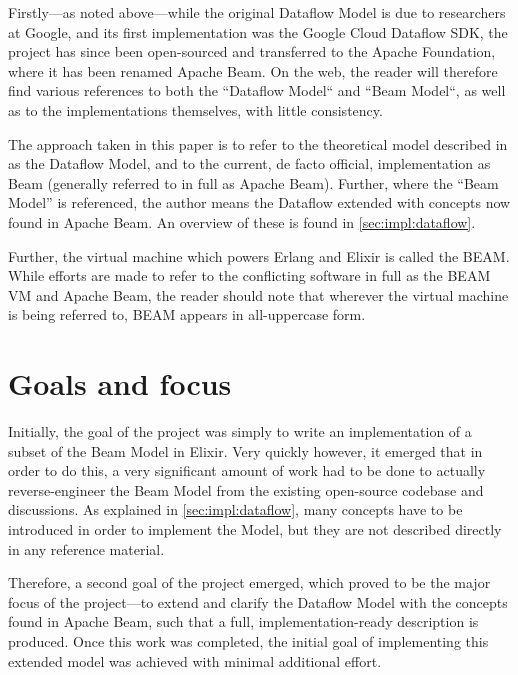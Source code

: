 
Firstly---as noted above---while the original Dataflow Model is due to researchers at Google, and its first implementation was the Google Cloud Dataflow SDK, the project has since been open-sourced and transferred to the Apache Foundation, where it has been renamed Apache Beam.
On the web, the reader will therefore find various references to both the ``Dataflow Model`` and ``Beam Model``, as well as to the implementations themselves, with little consistency.

The approach taken in this paper is to refer to the theoretical model described in \cite{Akidau:2015} as the Dataflow Model, and to the current, de facto official, implementation \cite{ApacheBeam} as Beam (generally referred to in full as Apache Beam).
Further, where the ``Beam Model'' is referenced, the author means the Dataflow extended with concepts now found in Apache Beam.
An overview of these is found in \cref{sec:impl:dataflow}.

Further, the virtual machine which powers Erlang and Elixir is called the BEAM.
While efforts are made to refer to the conflicting software in full as the BEAM VM and Apache Beam, the reader should note that wherever the virtual machine is being referred to, BEAM appears in all-uppercase form.

\section{Goals and focus}\label{sec:intro:goals}

Initially, the goal of the project was simply to write an implementation of a subset of the Beam Model in Elixir.
Very quickly however, it emerged that in order to do this, a very significant amount of work had to be done to actually reverse-engineer the Beam Model from the existing open-source codebase and discussions.
As explained in \cref{sec:impl:dataflow}, many concepts have to be introduced in order to implement the Model, but they are not described directly in any reference material.

Therefore, a second goal of the project emerged, which proved to be the major focus of the project---to extend and clarify the Dataflow Model with the concepts found in Apache Beam, such that a full, implementation-ready description is produced.
Once this work was completed, the initial goal of implementing this extended model was achieved with minimal additional effort.

